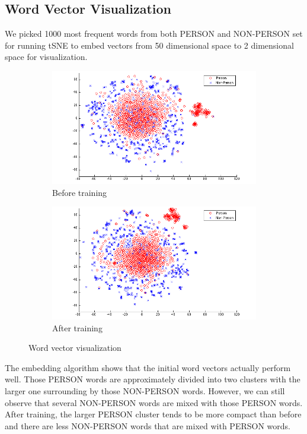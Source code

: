 \documentclass[letterpaper]{article}
\begin{document}
\subsection{Word Vector Visualization}
We picked 1000 most frequent words from both PERSON and NON-PERSON set for running tSNE to embed vectors from 50 dimensional space to 2 dimensional space for visualization.
\begin{figure}[ht]
\centering
\begin{subfigure}{.5\textwidth}
  \centering
  \includegraphics[width=1.0\linewidth]{before.png}
  \caption{Before training}
  \label{fig:vectors_before}
\end{subfigure}%
\begin{subfigure}{.5\textwidth}
  \centering
  \includegraphics[width=1.0\linewidth]{after.png}
  \caption{After training}
  \label{fig:vectors_after}
\end{subfigure}
\caption{Word vector visualization}
\label{fig:vectors}
\end{figure}
The embedding algorithm shows that the initial word vectors actually perform well. Those PERSON words are approximately divided into two clusters with the larger one surrounding by those NON-PERSON words. However, we can still observe that several NON-PERSON words are mixed with those PERSON words.
After training, the larger PERSON cluster tends to be more compact than before and there are less NON-PERSON words that are mixed with PERSON words.
\end{document}
